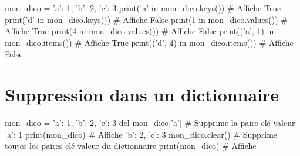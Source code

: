 	\begin{CodePythontexAlt}[TaillePolice=\normalsize, Largeur=1\linewidth,Centre,PremLigne=1]{}
mon_dico = {'a': 1, 'b': 2, 'c': 3}
print('a' in mon_dico.keys())  # Affiche True
print('d' in mon_dico.keys())  # Affiche False
print(1 in mon_dico.values())  # Affiche True
print(4 in mon_dico.values())  # Affiche False
print(('a', 1) in mon_dico.items())  # Affiche True
print(('d', 4) in mon_dico.items())  # Affiche False
\end{CodePythontexAlt}

\section{Suppression dans un dictionnaire}

	\begin{CodePythontexAlt}[TaillePolice=\normalsize, Largeur=1\linewidth,Centre,PremLigne=1]{}
mon_dico = {'a': 1, 'b': 2, 'c': 3}
del mon_dico['a']  # Supprime la paire clé-valeur 'a': 1
print(mon_dico)  # Affiche {'b': 2, 'c': 3}
mon_dico.clear()  # Supprime toutes les paires clé-valeur du dictionnaire
print(mon_dico)  # Affiche {}
\end{CodePythontexAlt}

\pagebreak

